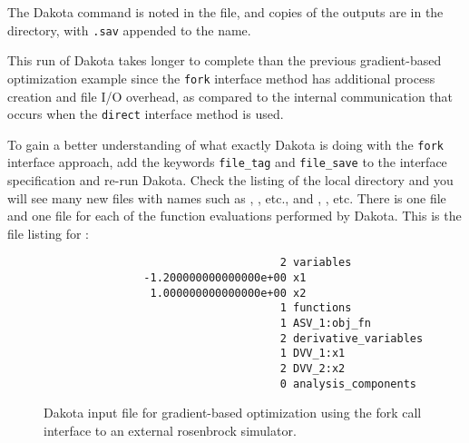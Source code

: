 The Dakota command is noted in the file, and copies of the outputs are
in the  directory, with
\texttt{.sav} appended to the name.

This run of Dakota takes longer to complete than the previous
gradient-based optimization example since the \texttt{fork}
interface method has additional process creation and file I/O
overhead, as compared to the internal communication that occurs when
the \texttt{direct} interface method is used. 

To gain a better understanding of what exactly Dakota is doing with
the \texttt{fork} interface approach, add the keywords
\texttt{file\_tag} and \texttt{file\_save} to the interface
specification and re-run Dakota. Check the listing of the local
directory and you will see many new files with names such as
, , etc., and
, , etc. There is one
 file and one  file for each
of the function evaluations performed by Dakota. This is the file
listing for :
\begin{small}
\begin{verbatim}
                                          2 variables
                     -1.200000000000000e+00 x1
                      1.000000000000000e+00 x2
                                          1 functions
                                          1 ASV_1:obj_fn
                                          2 derivative_variables
                                          1 DVV_1:x1
                                          2 DVV_2:x2
                                          0 analysis_components
\end{verbatim}
\end{small}

\begin{figure}[b!]
  \begin{bigbox}
    \begin{small}
    \end{small}
  \end{bigbox}
  \caption{Dakota input file for gradient-based optimization using the
    fork call interface to an external rosenbrock simulator.}
  \label{tutorial:rosenbrock_user}
\end{figure}

